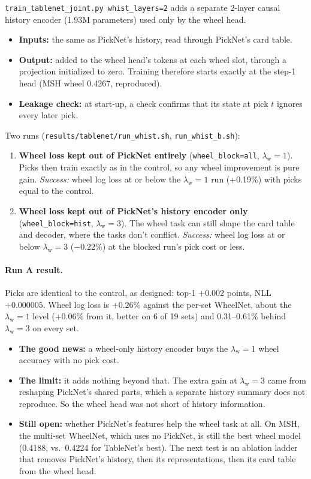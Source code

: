 \documentclass[11pt,letterpaper]{article}
\newcommand{\code}[1]{\texttt{\small #1}}
\newcommand{\lw}{\lambda_{\text{w}}}
\begin{document}
\code{train\_tablenet\_joint.py whist\_layers=2} adds a separate 2-layer causal history encoder (1.93M
parameters) used only by the wheel head.
\begin{itemize}
\item \textbf{Inputs:} the same as PickNet's history, read through PickNet's card table.
\item \textbf{Output:} added to the wheel head's tokens at each wheel slot, through a projection initialized to
zero. Training therefore starts exactly at the step-1 head (MSH wheel 0.4267, reproduced).
\item \textbf{Leakage check:} at start-up, a check confirms that its state at pick $t$ ignores every later pick.
\end{itemize}
Two runs (\code{results/tablenet/run\_whist.sh}, \code{run\_whist\_b.sh}):
\begin{enumerate}[label=\Alph*.]
\item \textbf{Wheel loss kept out of PickNet entirely} (\code{wheel\_block=all}, $\lw=1$). Picks then train exactly
as in the control, so any wheel improvement is pure gain. \emph{Success:} wheel log loss at or below the $\lw=1$
run (+0.19\%) with picks equal to the control.
\item \textbf{Wheel loss kept out of PickNet's history encoder only} (\code{wheel\_block=hist}, $\lw=3$). The wheel
task can still shape the card table and decoder, where the tasks don't conflict. \emph{Success:} wheel log loss
at or below $\lw=3$ ($-$0.22\%) at the blocked run's pick cost or less.
\end{enumerate}

\paragraph{Run A result.} Picks are identical to the control, as designed: top-1 $+0.002$ points, NLL
$+0.000005$. Wheel log loss is $+0.26\%$ against the per-set WheelNet, about the $\lw=1$ level ($+0.06\%$ from it,
better on 6 of 19 sets) and 0.31--0.61\% behind $\lw=3$ on every set.
\begin{itemize}
\item \textbf{The good news:} a wheel-only history encoder buys the $\lw=1$ wheel accuracy with no pick cost.
\item \textbf{The limit:} it adds nothing beyond that. The extra gain at $\lw=3$ came from reshaping PickNet's
shared parts, which a separate history summary does not reproduce. So the wheel head was not short of history
information.
\item \textbf{Still open:} whether PickNet's features help the wheel task at all. On MSH, the multi-set WheelNet,
which uses no PickNet, is still the best wheel model (0.4188, vs.\ 0.4224 for TableNet's best). The next test is an
ablation ladder that removes PickNet's history, then its representations, then its card table from the wheel head.
\end{itemize}
\end{document}
